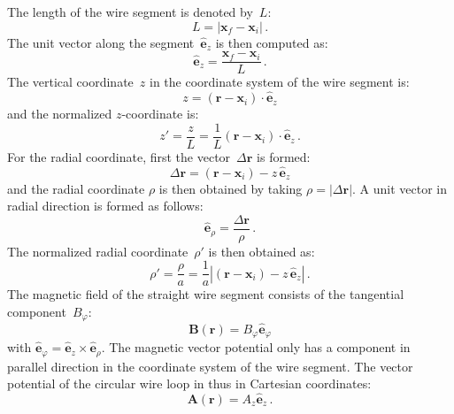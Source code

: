 The length of the wire segment is denoted by~$L$:
\begin{equation}
  L = |\mathbf{x}_f - \mathbf{x}_i| \, .
\end{equation}
The unit vector along the segment~$\hat{\mathbf{e}}_z$ is then computed as:
\begin{equation}
  \hat{\mathbf{e}}_z = \frac{\mathbf{x}_f - \mathbf{x}_i}{L} \, .
\end{equation}
The vertical coordinate~$z$ in the coordinate system of the wire segment is:
\begin{equation}
  z = (\mathbf{r} - \mathbf{x}_i) \cdot \hat{\mathbf{e}}_z
\end{equation}
and the normalized $z$-coordinate is:
\begin{equation}
  z' = \frac{z}{L} = \frac{1}{L} (\mathbf{r} - \mathbf{x}_i) \cdot \hat{\mathbf{e}}_z \, .
\end{equation}
For the radial coordinate, first the vector~$\Delta \mathbf{r}$ is formed:
\begin{equation}
  \Delta \mathbf{r} = (\mathbf{r} - \mathbf{x}_i) - z \, \hat{\mathbf{e}}_z
\end{equation}
and the radial coordinate $\rho$ is then obtained by taking $\rho = |\Delta \mathbf{r}|$.
A unit vector in radial direction is formed as follows:
\begin{equation}
  \hat{\mathbf{e}}_\rho = \frac{\Delta \mathbf{r}}{\rho} \, .
\end{equation}
The normalized radial coordinate~$\rho'$ is then obtained as:
\begin{equation}
  \rho' = \frac{\rho}{a} = \frac{1}{a} |(\mathbf{r} - \mathbf{x}_i) - z \, \hat{\mathbf{e}}_z| \, .
\end{equation}
The magnetic field of the straight wire segment consists of the tangential component~$B_\varphi$:
\begin{equation}
  \mathbf{B}(\mathbf{r}) = B_\varphi \hat{\mathbf{e}}_\varphi
\end{equation}
with $\hat{\mathbf{e}}_\varphi = \hat{\mathbf{e}}_z \times \hat{\mathbf{e}}_\rho$.
The magnetic vector potential only has a component in parallel direction in the coordinate system of the wire segment.
The vector potential of the circular wire loop in thus in Cartesian coordinates:
\begin{equation}
  \mathbf{A}(\mathbf{r}) = A_z \hat{\mathbf{e}}_z \, .
\end{equation}

